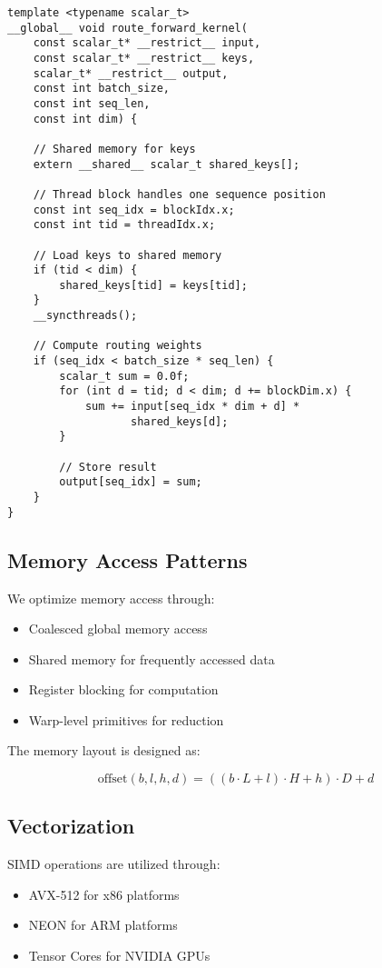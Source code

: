 \documentclass[10pt]{article}
\begin{document}
\begin{verbatim}
template <typename scalar_t>
__global__ void route_forward_kernel(
    const scalar_t* __restrict__ input,
    const scalar_t* __restrict__ keys,
    scalar_t* __restrict__ output,
    const int batch_size,
    const int seq_len,
    const int dim) {
    
    // Shared memory for keys
    extern __shared__ scalar_t shared_keys[];
    
    // Thread block handles one sequence position
    const int seq_idx = blockIdx.x;
    const int tid = threadIdx.x;
    
    // Load keys to shared memory
    if (tid < dim) {
        shared_keys[tid] = keys[tid];
    }
    __syncthreads();
    
    // Compute routing weights
    if (seq_idx < batch_size * seq_len) {
        scalar_t sum = 0.0f;
        for (int d = tid; d < dim; d += blockDim.x) {
            sum += input[seq_idx * dim + d] * 
                   shared_keys[d];
        }
        
        // Store result
        output[seq_idx] = sum;
    }
}
\end{verbatim}

\subsection{Memory Access Patterns}
We optimize memory access through:

\begin{itemize}
    \item Coalesced global memory access
    \item Shared memory for frequently accessed data
    \item Register blocking for computation
    \item Warp-level primitives for reduction
\end{itemize}

The memory layout is designed as:

\begin{equation}
    \text{offset}(b,l,h,d) = ((b \cdot L + l) \cdot H + h) \cdot D + d
\end{equation}

\subsection{Vectorization}
SIMD operations are utilized through:

\begin{itemize}
    \item AVX-512 for x86 platforms
    \item NEON for ARM platforms
    \item Tensor Cores for NVIDIA GPUs
\end{itemize}
\end{document}
